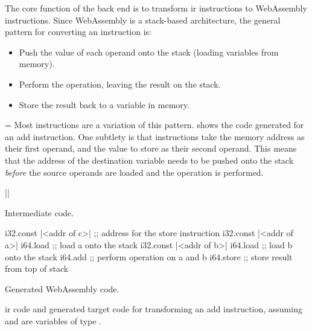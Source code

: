 \documentclass[00-main.tex]{subfiles}
\begin{document}
\par\nobreak\vfil{}\vfilneg %
   \vtop\bgroup %
The core function of the back end is to transform \gls{ir} instructions to WebAssembly instructions.
Since WebAssembly is a stack-based architecture, the general pattern for converting an instruction is:
\begin{itemize}[nosep]
\item Push the value of each operand onto the stack (loading variables from memory).
\item Perform the operation, leaving the result on the stack.
\item Store the result back to a variable in memory.
\end{itemize}
\par\xdef\tpd{\the\prevdepth}\egroup %
   \prevdepth=\tpd %
Most instructions are a variation of this pattern.
 shows the code generated for an add instruction.
One subtlety is that  instructions take the memory address as their first operand, and the value to store as their second operand.
This means that the address of the destination variable needs to be pushed onto the stack \emph{before} the source operands are loaded and the operation is performed.

\begin{listing}[t]
  \begin{sublisting}[b]{0.28\textwidth}
    \begin{TextListing}
      ||
    \end{TextListing}
    \caption{Intermediate code.}
  \end{sublisting}
  \hfill
  \begin{sublisting}[b]{0.7\textwidth}
    \begin{WasmListing}
      i32.const |<addr of c>|  ;; address for the store instruction
      i32.const |<addr of a>|
      i64.load               ;; load a onto the stack
      i32.const |<addr of b>|
      i64.load               ;; load b onto the stack
      i64.add                ;; perform operation on a and b
      i64.store              ;; store result from top of stack
    \end{WasmListing}
    \caption{Generated WebAssembly code.}
  \end{sublisting}
  \caption{\Gls{ir} code and generated target code for transforming an add instruction, assuming  and  are variables of type .}
  \label{lst:converting add instr to wasm code}
\end{listing}
\end{document}
